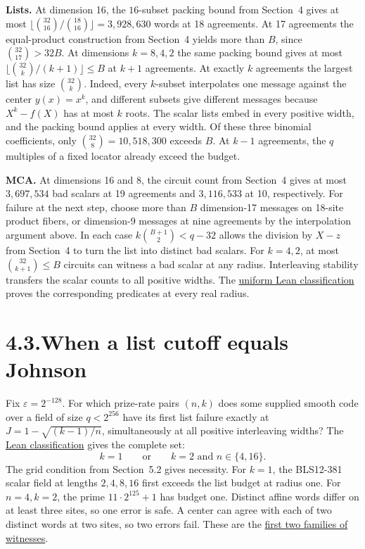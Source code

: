 \documentclass[11pt,letterpaper]{article}
\begin{document}
\textbf{Lists.} At dimension 16, the $16$-subset packing bound from Section~4 gives at most
$\lfloor\binom{32}{16}/\binom{18}{16}\rfloor=3{,}928{,}630$ words at 18 agreements.
At 17 agreements the equal-product construction from Section~4 yields more than $B$,
since $\binom{32}{17}>32B$. At dimensions $k=8,4,2$ the same packing bound gives
at most $\lfloor\binom{32}k/(k+1)\rfloor\le B$ at $k+1$ agreements. At exactly $k$
agreements the largest list has size $\binom{32}k$. Indeed, every $k$-subset interpolates
one message against the center $y(x)=x^k$, and different subsets give different messages
because $X^k-f(X)$ has at most $k$ roots. The scalar lists embed in every positive width,
and the packing bound applies at every width. Of these three binomial coefficients,
only $\binom{32}8=10{,}518{,}300$ exceeds $B$. At $k-1$ agreements, the $q$ multiples
of a fixed locator already exceed the budget.

\textbf{MCA.} At dimensions 16 and 8, the circuit count from Section~4 gives at most
$3{,}697{,}534$ bad scalars at 19 agreements and $3{,}116{,}533$ at 10, respectively.
For failure at the next step, choose more than $B$ dimension-17 messages on 18-site
product fibers, or dimension-9 messages at nine agreements by the interpolation argument
above. In each case $k\binom{B+1}{2}<q-32$ allows the division by $X-z$ from Section~4
to turn the list into distinct bad scalars. For $k=4,2$, at most $\binom{32}{k+1}\le B$
circuits can witness a bad scalar at any radius. Interleaving stability transfers the
scalar counts to all positive widths. The \href{https://github.com/SlopDotCash/proximityprize/blob/797227d570944e033c0af8fc9fff22e4be8f7e7c/ArkLib/Research/ProximityGap/Frontier/FourRateBudget32.lean}{uniform Lean classification} proves the corresponding predicates at every real radius.

\newpage
\section*{4.3.\quad When a list cutoff equals Johnson}
Fix $\varepsilon=2^{-128}$. For which prize-rate pairs $(n,k)$ does some supplied smooth code
over a field of size $q<2^{256}$ have its first list failure exactly at
$J=1-\sqrt{(k-1)/n}$, simultaneously at all positive interleaving widths?
The \href{https://github.com/SlopDotCash/proximityprize/blob/7414125df9ddb8fb4682c9baa619de520ed4bae7/ArkLib/Research/ProximityGap/JohnsonEqualityClassification.lean}{Lean classification}
gives the complete set:
\[
          k=1 \qquad\text{or}\qquad k=2\text{ and }n\in\{4,16\}.
\]
The grid condition from Section~5.2 gives necessity. For $k=1$, the BLS12-381 scalar
field at lengths $2,4,8,16$ first exceeds the list budget at radius one. For $n=4,k=2$,
the prime $11\cdot2^{125}+1$ has budget one. Distinct affine words differ on at
least three sites, so one error is safe. A center can agree with each of two distinct
words at two sites, so two errors fail. These are the
\href{https://github.com/SlopDotCash/proximityprize/blob/7414125df9ddb8fb4682c9baa619de520ed4bae7/ArkLib/Research/ProximityGap/JohnsonEqualityExamples.lean}{first two families of witnesses}.
\end{document}
